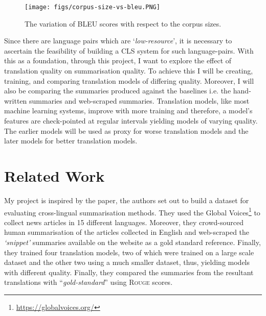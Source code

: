 \documentclass[12pt,a4paper,twoside,openright]{report}
\newcommand{\rouge}{\textsc{Rouge} }
\begin{document}
\begin{figure}
    \centering
    \texttt{[image: figs/corpus-size-vs-bleu.PNG]}
    \caption{The variation of BLEU scores with respect to the corpus sizes. }
    \label{fig:corpus-size-vs-bleu}
\end{figure}

Since there are language pairs which are `\textit{low-resource}', it is necessary to ascertain the feasibility of building a CLS system for such language-pairs.
With this as a foundation, through this project, I want to explore the effect of translation quality on summarisation quality. To achieve this I will be creating, training, and comparing translation models of differing quality. Moreover, I will also be comparing the summaries produced against the baselines i.e. the hand-written summaries and web-scraped summaries. Translation models, like most machine learning systems, improve with more training and therefore, a model's features are check-pointed at regular intervals yielding models of varying quality. The earlier models will be used as proxy for worse translation models and the later models for better translation models.

\section{Related Work}
\label{related-work}
My project is inspired by the paper\cite{nguyen-daume-iii-2019-global}, the authors set out to build a dataset for evaluating cross-lingual summarisation methods. They used the Global Voices\footnote{\url{https://globalvoices.org/}} to collect news articles in 15 different languages. Moreover, they crowd-sourced human summarisation of the articles collected in English and web-scraped the \textit{`snippet'} summaries available on the website as a gold standard reference. Finally, they trained four translation models, two of which were trained on a large scale dataset and the other two using a much smaller dataset, thus, yielding models with different quality. Finally, they compared the summaries from the resultant translations with ``\textit{gold-standard}'' using \rouge scores.
\newpage
\end{document}
